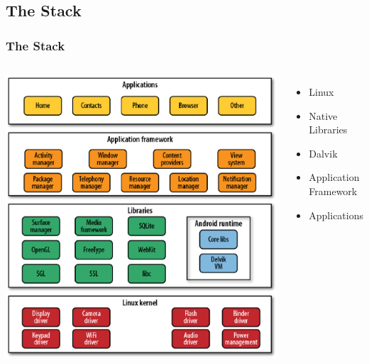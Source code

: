 \subsection{The Stack}
\begin{frame}
\frametitle{The Stack}
\centering
\begin{columns}
\centering
\includegraphics[width= 0.60 \textwidth]{fig-7.eps}
\begin{itemize}
\item Linux
\item Native Libraries
\item Dalvik
\item Application Framework
\item Applications
\end{itemize}


\end{columns}
\end{frame}

